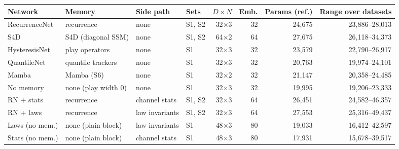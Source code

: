 \begin{tabular}{@{}llllrrrr@{}}
\toprule
Network & Memory & Side path & Sets & $D{\times}N$ & Emb. & Params (ref.) & Range over datasets \\
\midrule
RecurrenceNet & recurrence & none & S1, S2 & 32$\times$3 & 32 & 24,675 & 23,886--28,013 \\
S4D & S4D (diagonal SSM) & none & S1, S2 & 64$\times$2 & 64 & 27,675 & 26,118--34,373 \\
HysteresisNet & play operators & none & S1 & 32$\times$3 & 32 & 23,579 & 22,790--26,917 \\
QuantileNet & quantile trackers & none & S1 & 32$\times$3 & 32 & 20,763 & 19,974--24,101 \\
Mamba & Mamba (S6) & none & S1 & 32$\times$2 & 32 & 21,147 & 20,358--24,485 \\
No memory & none (play width 0) & none & S1 & 32$\times$3 & 32 & 19,995 & 19,206--23,333 \\
RN + stats & recurrence & channel stats & S1, S2 & 32$\times$3 & 64 & 26,451 & 24,582--46,357 \\
RN + laws & recurrence & law invariants & S1, S2 & 32$\times$3 & 64 & 27,553 & 25,316--49,437 \\
Laws (no mem.) & none (plain block) & law invariants & S1 & 48$\times$3 & 80 & 19,033 & 16,412--42,597 \\
Stats (no mem.) & none (plain block) & channel stats & S1 & 48$\times$3 & 80 & 17,931 & 15,678--39,517 \\
\bottomrule
\end{tabular}
